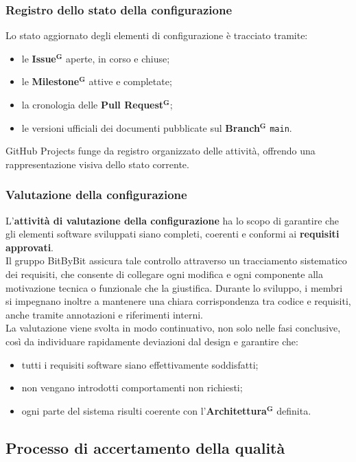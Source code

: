 \documentclass[a4paper,12pt]{article}
\newcommand{\term}[1]{\textbf{#1}$^\mathbf{G}$}
\begin{document}
\subsubsection{Registro dello stato della configurazione}
Lo stato aggiornato degli elementi di configurazione è tracciato tramite:
\begin{itemize}
    \item le \term{Issue} aperte, in corso e chiuse;
    \item le \term{Milestone} attive e completate;
    \item la cronologia delle \term{Pull Request};
    \item le versioni ufficiali dei documenti pubblicate sul \term{Branch} \texttt{main}.
\end{itemize}
GitHub Projects funge da registro organizzato delle attività, offrendo una rappresentazione visiva dello stato corrente.

\subsubsection{Valutazione della configurazione}
L'\textbf{attività di valutazione della configurazione} ha lo scopo di garantire che gli elementi software sviluppati siano completi, coerenti e conformi ai \textbf{requisiti approvati}.\\Il gruppo BitByBit assicura tale controllo attraverso un tracciamento sistematico dei requisiti, che consente di collegare ogni modifica e ogni componente alla motivazione tecnica o funzionale che la giustifica. Durante lo sviluppo, i membri si impegnano inoltre a mantenere una chiara corrispondenza tra codice e requisiti, anche tramite annotazioni e riferimenti interni.\\La valutazione viene svolta in modo continuativo, non solo nelle fasi conclusive, così da individuare rapidamente deviazioni dal design e garantire che:
\begin{itemize}
    \item tutti i requisiti software siano effettivamente soddisfatti;
    \item non vengano introdotti comportamenti non richiesti;
    \item ogni parte del sistema risulti coerente con l’\term{Architettura} definita.
\end{itemize}

\subsection{Processo di accertamento della qualità} \label{sec:accertamento-qualita}
\end{document}
